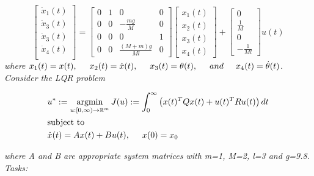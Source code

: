 \begin{equation}
\begin{bmatrix}
    \Dot{x}_1(t) \\ \Dot{x}_3(t) \\ \Dot{x}_3(t) \\  \Dot{x}_4(t) \\ 
\end{bmatrix}
=
\begin{bmatrix}
    0 & 1 & 0 & 0 \\
    0 & 0 & -\frac{mg}{M} & 0 \\
    0 & 0 & 0 & 1 \\
    0 & 0 & \frac{(M+m)g}{Ml} & 0 
\end{bmatrix}
\begin{bmatrix}
    x_1(t) \\ x_2(t) \\ x_3(t) \\ x_4(t)
\end{bmatrix}
+
\begin{bmatrix}
    0 \\ \frac{1}{M} \\ 0 \\ - \frac{1}{Ml}
\end{bmatrix}
u(t)
\end{equation}
\emph{where $x_1(t) = x(t), \hspace{0.5cm} x_2(t) = \Dot{x}(t), \hspace{0.5cm} x_3(t) = \theta(t), \hspace{0.5cm} and \hspace{0.5cm} x_4(t) = \Dot{\theta}(t)$.}\\
\emph{Consider the LQR problem}

\begin{align}
    &u^* := \operatorname*{argmin}_{u:[0,\infty) \to \mathbb{R}^m} J(u) := \int_0^\infty \left( x(t)^T Qx(t) + u(t)^T R u(t) \right) dt \\
    &\text{subject to}\\
    &\Dot{x}(t) = Ax(t) + Bu(t), \hspace{0.5cm} x(0) = x_0
\end{align}

\emph{where A and B are appropriate system matrices with m=1, M=2, l=3 and g=9.8.} \\
\emph{Tasks:}

